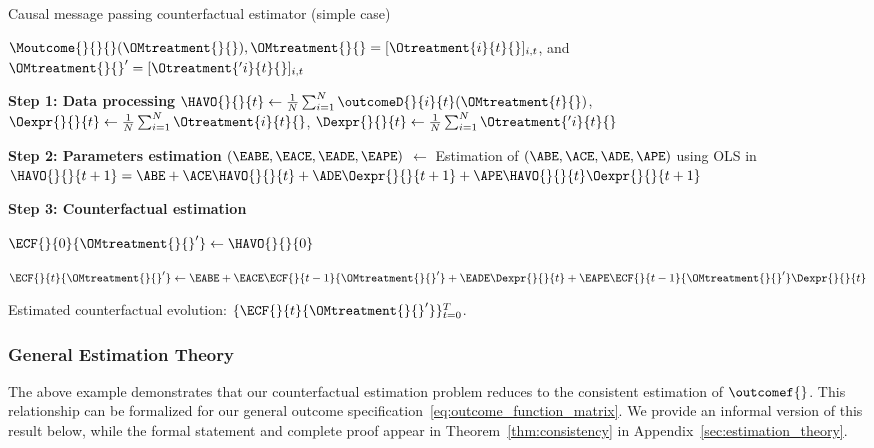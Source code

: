 % 
\begin{algorithm}
\caption{Causal message passing counterfactual estimator (simple case)}
\label{alg:example_algorithm}
% 
\begin{algorithmic}
% 
% 
\Require $\Moutcome{}{}{}(\OMtreatment{}{}), \OMtreatment{}{} = [\Otreatment{i}{t}{}]_{i,t}$, and $\OMtreatment{}{}' = [\Otreatment{'i}{t}{}]_{i,t}$
% 

\State \hspace{-1.3em} \textbf{Step 1: Data processing}
% 
\State $\HAVO{}{}{t} \gets \frac{1}{N} \sum_{i=1}^N \outcomeD{}{i}{t} (\OMtreatment{t}{})$, \quad\quad $\Oexpr{}{}{t} \gets \frac{1}{N} \sum_{i=1}^N \Otreatment{i}{t}{}$, \quad\quad $\Dexpr{}{}{t} \gets \frac{1}{N} \sum_{i=1}^N \Otreatment{'i}{t}{}$
% 
\EndFor
% 

\State \hspace{-1.3em} \textbf{Step 2: Parameters estimation}
% 
\State $(\EABE, \EACE, \EADE, \EAPE)$ $\gets$ Estimation of $(\ABE, \ACE, \ADE, \APE)$ using OLS in $\HAVO{}{}{t+1} = \ABE + \ACE \HAVO{}{}{t} + \ADE \Oexpr{}{}{t+1} + \APE \HAVO{}{}{t} \Oexpr{}{}{t+1}$


\State \hspace{-1.3em} \textbf{Step 3: Counterfactual estimation}

\State $\ECF{}{0}{\OMtreatment{}{}'} \gets \HAVO{}{}{0}$

%
    \State $\ECF{}{t}{\OMtreatment{}{}'} \gets \EABE + \EACE \ECF{}{t-1}{\OMtreatment{}{}'} + \EADE \Dexpr{}{}{t} + \EAPE \ECF{}{t-1}{\OMtreatment{}{}'} \Dexpr{}{}{t}$
% 
\EndFor

\Ensure Estimated counterfactual evolution: $\{\ECF{}{t}{\OMtreatment{}{}'}\}_{t=0}^T$.
% 
\end{algorithmic}
\end{algorithm}
% 

\subsubsection{General Estimation Theory} 

The above example demonstrates that our counterfactual estimation problem reduces to the consistent estimation of $\outcomef{}$. This relationship can be formalized for our general outcome specification~\eqref{eq:outcome_function_matrix}. We provide an informal version of this result below, while the formal statement and complete proof appear in Theorem~\ref{thm:consistency} in Appendix~\ref{sec:estimation_theory}.

